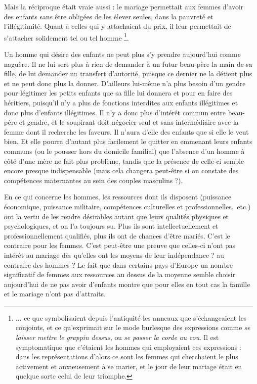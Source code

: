  Mais la réciproque était vraie aussi : le mariage permettait aux femmes d'avoir des enfants sans être obligées de les élever seules, dans la pauvreté et l'illégitimité. Quant à celles qui y attachaient du prix, il leur permettait de s'attacher solidement tel ou tel homme
\footnote{... ce que symbolisaient depuis l'antiquité les anneaux que s'échangeaient les conjoints, et ce qu'exprimait sur le mode burlesque des expressions comme {\emph{se laisser mettre le grappin dessus}}, ou {\emph{se passer la corde au cou}}. Il est symptomatique que c'étaient les hommes qui employaient ces expressions : dans les représentations d'alors ce sont les femmes qui cherchaient le plus activement et anxieusement à se marier, et le jour de leur mariage était en quelque sorte celui de leur triomphe.}.
 
 Un homme qui désire des enfants ne peut plus s'y prendre aujourd'hui comme naguère. Il ne lui sert plus à rien de demander à un futur beau-père la main de sa fille, de lui demander un transfert d'autorité, puisque ce dernier ne la détient plus et ne peut donc plus la donner. D'ailleurs lui-même n'a plus besoin d'un gendre pour légitimer les petits enfants que sa fille lui donnera et pour en faire des héritiers, puisqu'il n'y a plus de fonctions interdites aux enfants illégitimes et donc plus d'enfants illégitimes. Il n'y a donc plus d'intérêt commun entre beau-père et gendre, et le soupirant doit négocier seul et sans intermédiaire avec la femme dont il recherche les faveurs. Il n'aura d'elle des enfants que si elle le veut bien. Et elle pourra d'autant plus facilement le quitter en emmenant leurs enfants communs (ou le pousser hors du domicile familial) que l'absence d'un homme à côté d'une mère ne fait plus problème, tandis que la présence de celle-ci semble encore presque indispensable (mais cela changera peut-être si on constate des compétences maternantes au sein des couples masculins ?). 
 
 En ce qui concerne les hommes, les ressources dont ils disposent (puissance économique, puissance militaire, compétences culturelles et professionnelles,~etc.) ont la vertu de les rendre désirables autant que leurs qualités physiques et psychologiques, et on l'a toujours su. Plus ils sont intellectuellement et professionnellement qualifiés, plus ils ont de chances d'être mariés. C'est le contraire pour les femmes. C'est peut-être une preuve que celles-ci n'ont pas intérêt au mariage dès qu'elles ont les moyens de leur indépendance ? au contraire des hommes ? Le fait que dans certains pays d'Europe un nombre significatif de femmes aux ressources au dessus de la moyenne semble choisir aujourd'hui de ne pas avoir d'enfants montre que pour elles en tout cas la famille et le mariage n'ont pas d'attraits. 
 
